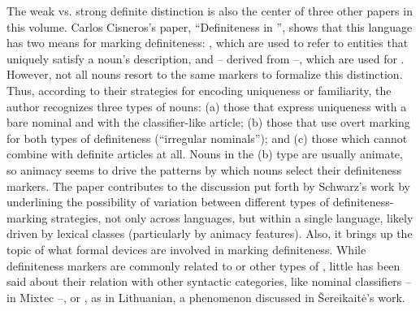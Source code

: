 \documentclass[output=paper]{langsci/langscibook}
\begin{document}
The weak vs. strong definite distinction is also the center of three other papers in this volume. Carlos Cisneros’s paper, “Definiteness in ”, shows that this  language has two means for marking definiteness: , which are used to refer to entities that uniquely satisfy a noun’s description, and   -- derived from  --, which are used for . However, not all nouns resort to the same markers to formalize this distinction. Thus, according to their strategies for encoding uniqueness or familiarity, the author recognizes three types of nouns: (a) those that express uniqueness with a bare nominal and  with the classifier-like article; (b) those that use overt marking for both types of definiteness (“irregular nominals”); and (c) those which cannot combine with definite articles at all. Nouns in the (b) type are usually animate, so animacy seems to drive the patterns by which nouns select their definiteness markers. The paper contributes to the discussion put forth by Schwarz’s work by underlining the possibility of variation between different types of definiteness-marking strategies, not only across languages, but within a single language, likely driven by lexical classes (particularly by animacy features). Also, it brings up the topic of what formal devices are involved in marking definiteness. While definiteness markers are commonly related to  or other types of , little has been said about their relation with other syntactic categories, like nominal classifiers -- in Mixtec --, or , as in Lithuanian, a phenomenon discussed in Šereikaitė’s work. 
\end{document}
